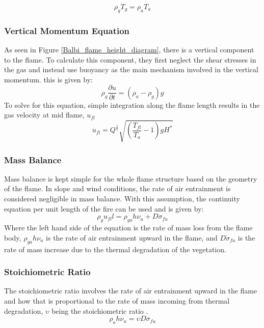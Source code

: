 \documentclass{article}
\begin{document}
\begin{equation}
	\label{state equation}
	\rho _g T_g = \rho _a T_a
\end{equation}

\subsubsection*{Vertical Momentum Equation}
\indent As seen in Figure \ref{Balbi_flame_height_diagram}, there is a vertical component to the flame. To calculate this component, they first neglect the shear stresses in the gas and instead use buoyancy as the main mechanism involved in the vertical momentum. this is given by: 
\begin{equation}
	\label{Vertical momentum Balbi}
	\rho _ g \frac {\partial u} {\partial t} = (\rho _a - \rho _g) g
\end{equation}
\indent To solve for this equation, simple integration along the flame length results in the gas velocity at mid flame, $u_{fl}$
\begin{equation}
	\label{gas velocity}
	u_{fl} = Q ^ {\frac {1}{5}} \sqrt{(\frac {T_{fl}} {T_a} - 1) g H^{*}}
\end{equation}
\subsubsection*{Mass Balance}
\indent Mass balance is kept simple for the whole flame structure based on the geometry of the flame. In slope and wind conditions, the rate of air entrainment is considered negligible in mass balance. With this assumption, the continuity equation per unit length of the fire can be used and is given by:
\begin{equation}
	\label{mass balance balbi}
	\rho_g u_{fl}l = \rho_{ga} h \nu _u + D \dot{\sigma} _ {fu}
\end{equation}
Where the left hand side of the equation is the rate of mass loss from the flame body, $ \rho_{ga} h \nu _u$ is the rate of air entrainment upward in the flame, and $D \dot{\sigma} _ {fu}$ is the rate of mass increase due to the thermal degradation of the vegetation. \\

\subsubsection*{Stoichiometric Ratio}
\indent The stoichiometric ratio involves the rate of air entrainment upward in the flame and how that is proportional to the rate of mass incoming from thermal degradation, $\upsilon$ being the stoichiometric ratio \citep{Balbi2007}. 
\begin{equation}
	\label{stoich ratio}
	\rho _ a h \nu _ u = \upsilon D \dot{\sigma} _ {fu}
\end{equation}
\end{document}
